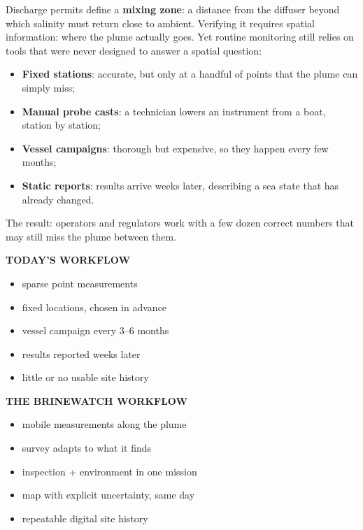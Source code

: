 \documentclass[10pt,a4paper]{article}
\newcommand{\keyword}[1]{\textbf{\color{deepblue}#1}}
\begin{document}
Discharge permits define a \keyword{mixing zone}: a distance from the diffuser beyond which
salinity must return close to ambient. Verifying it requires spatial information: where the plume
actually goes. Yet routine monitoring still relies on tools that were never designed to answer a
spatial question:

\begin{itemize}
  \item \keyword{Fixed stations}: accurate, but only at a handful of points that the plume can simply miss;
  \item \keyword{Manual probe casts}: a technician lowers an instrument from a boat, station by station;
  \item \keyword{Vessel campaigns}: thorough but expensive, so they happen every few months;
  \item \keyword{Static reports}: results arrive weeks later, describing a sea state that has already changed.
\end{itemize}

The result: operators and regulators work with a few dozen correct numbers that may still
miss the plume between them.

\vspace{4pt}
\noindent
\begin{minipage}[t]{0.485\textwidth}
\begin{panel}
{\sffamily\bfseries\color{muted}TODAY'S WORKFLOW}\\[4pt]
\small
\begin{itemize}
  \item sparse point measurements
  \item fixed locations, chosen in advance
  \item vessel campaign every 3--6 months
  \item results reported weeks later
  \item little or no usable site history
\end{itemize}
\end{panel}
\end{minipage}\hfill
\begin{minipage}[t]{0.485\textwidth}
\begin{tealpanel}
{\sffamily\bfseries\color{teal}THE BRINEWATCH WORKFLOW}\\[4pt]
\small
\begin{itemize}
  \item mobile measurements along the plume
  \item survey adapts to what it finds
  \item inspection + environment in one mission
  \item map with explicit uncertainty, same day
  \item repeatable digital site history
\end{itemize}
\end{tealpanel}
\end{minipage}
\end{document}
